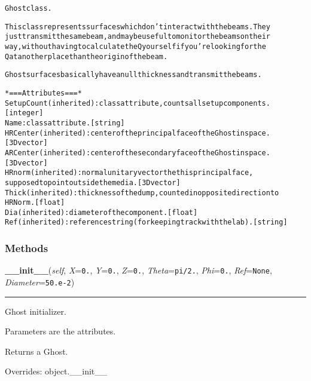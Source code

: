 \begin{alltt}


Ghost class.

This class represents surfaces which don't interact with the beams. They
just transmit the same beam, and may be useful to monitor the beams on their
way, without having to calculate the Q yourself if you're looking for the
Q at another place than the origin of the beam.

Ghost surfaces basically have a null thickness and transmit the beams.

*=== Attributes ===*
SetupCount (inherited): class attribute, counts all setup components.
    [integer]
Name: class attribute. [string]
HRCenter (inherited): center of the principal face of the Ghost in space.
    [3D vector]
ARCenter (inherited): center of the secondary face of the Ghost in space.
    [3D vector]
HRnorm (inherited): normal unitary vector the this principal face,
    supposed to point outside the media. [3D vector]
Thick (inherited): thickness of the dump, counted in opposite direction to
    HRNorm. [float]
Dia (inherited): diameter of the component. [float]
Ref (inherited): reference string (for keeping track with the lab). [string]
\end{alltt}



  \subsubsection{Methods}

    \vspace{0.5ex}

\hspace{.8\funcindent}\begin{boxedminipage}{\funcwidth}

    \raggedright \textbf{\_\_init\_\_}(\textit{self}, \textit{X}={\tt 0.}, \textit{Y}={\tt 0.}, \textit{Z}={\tt 0.}, \textit{Theta}={\tt pi/2.}, \textit{Phi}={\tt 0.}, \textit{Ref}={\tt None}, \textit{Diameter}={\tt 50.e-2})

    \vspace{-1.5ex}

    \rule{\textwidth}{0.5\fboxrule}
\setlength{\parskip}{2ex}
    Ghost initializer.

    Parameters are the attributes.

    Returns a Ghost.

\setlength{\parskip}{1ex}
      Overrides: object.\_\_init\_\_

    \end{boxedminipage}


